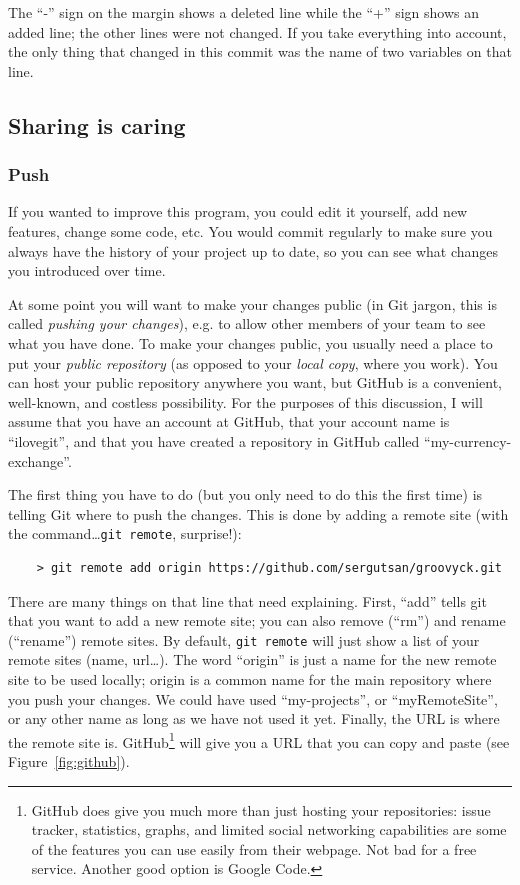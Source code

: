The ``-'' sign on the margin shows a deleted line while the ``+'' sign
shows an added line; the other lines were not changed. 
If you take everything into account, the only thing that changed
in this commit was the name of two variables on that line. 

\subsection{Sharing is caring}
\label{sec:sharing-caring}

\subsubsection{Push}
\label{sec:push}

If you wanted to improve this program, you could edit it yourself, add
new features, change some code, etc. You would commit regularly to
make sure you always have the history of your project up to date, so
you can see what changes you introduced over time. 

At some point you will want to make your changes public (in Git
jargon, this is called \emph{pushing your changes}), e.g. to allow
other members of your team to see what you have done. To make your
changes public, you usually need a place to put your \emph{public
repository} (as opposed to your \emph{local copy}, where you
work). You can host your public repository anywhere you want, but
GitHub is a convenient, well-known, and costless possibility. For the
purposes of this discussion, I will assume that you have an account at
GitHub, that your account name is ``ilovegit'', and that you have
created a repository in GitHub called ``my-currency-exchange''. 

The first thing you have to do (but you only need to do this the first
time) is telling Git where to push the changes. This is done by adding
a remote site (with the command\ldots \verb+git remote+, surprise!):

\begin{verbatim}
    > git remote add origin https://github.com/sergutsan/groovyck.git
\end{verbatim}

There are many things on that line that need explaining. First,
``add'' tells git that you want to add a new remote site; you can also
remove (``rm'') and rename (``rename'') remote sites. By default,
\verb+git remote+ will just show a list of your remote sites (name,
url\ldots). The word ``origin'' is just a name for the new remote site
to be used locally; origin is a common name for the main repository
where you push your changes. We could have used ``my-projects'', or
``myRemoteSite'', or any other name as long as we have not used it
yet. Finally, the URL is where the remote site
is. GitHub\footnote{GitHub does give you much more than just hosting
  your repositories: issue tracker, statistics, graphs, and limited
  social networking capabilities are some of the features you can use
  easily from their webpage. Not bad for a free service. Another good
  option is Google Code.} will give
you a URL that you can copy and paste (see Figure~\ref{fig:github}).

